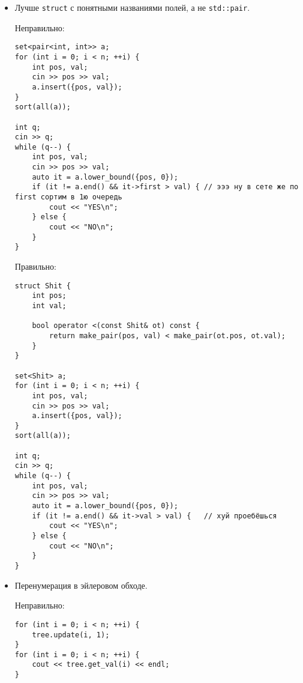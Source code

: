 \begin{itemize}
Правильно:

\begin{verbatim}
for (int i = 0; i < n; ++i) {
    tree.set(i, a[i]);
}
tree.build();
for (int i = 0; i < Q; ++i) {
    int pos, val;
    cin >> pos >> val;
    tree.update(pos, val);
}
\end{verbatim}

\item Лучше \texttt{struct} с понятными названиями полей, а не \texttt{std::pair}.

Неправильно:

\begin{verbatim}
set<pair<int, int>> a;
for (int i = 0; i < n; ++i) {
    int pos, val;
    cin >> pos >> val;
    a.insert({pos, val});
}
sort(all(a));

int q;
cin >> q;
while (q--) {
    int pos, val;
    cin >> pos >> val;
    auto it = a.lower_bound({pos, 0});
    if (it != a.end() && it->first > val) { // эээ ну в сете же по first сортим в 1ю очередь
        cout << "YES\n";
    } else {
        cout << "NO\n";
    }
}
\end{verbatim}

Правильно:

\begin{verbatim}
struct Shit {
    int pos;
    int val;
    
    bool operator <(const Shit& ot) const {
        return make_pair(pos, val) < make_pair(ot.pos, ot.val);
    }
}

set<Shit> a;
for (int i = 0; i < n; ++i) {
    int pos, val;
    cin >> pos >> val;
    a.insert({pos, val});
}
sort(all(a));

int q;
cin >> q;
while (q--) {
    int pos, val;
    cin >> pos >> val;
    auto it = a.lower_bound({pos, 0});
    if (it != a.end() && it->val > val) {   // хуй проебёшься
        cout << "YES\n";
    } else {
        cout << "NO\n";
    }
}
\end{verbatim}

\item Перенумерация в эйлеровом обходе.

Неправильно:

\begin{verbatim}
for (int i = 0; i < n; ++i) {
    tree.update(i, 1);
}
for (int i = 0; i < n; ++i) {
    cout << tree.get_val(i) << endl;
}
\end{verbatim}


\end{itemize}

